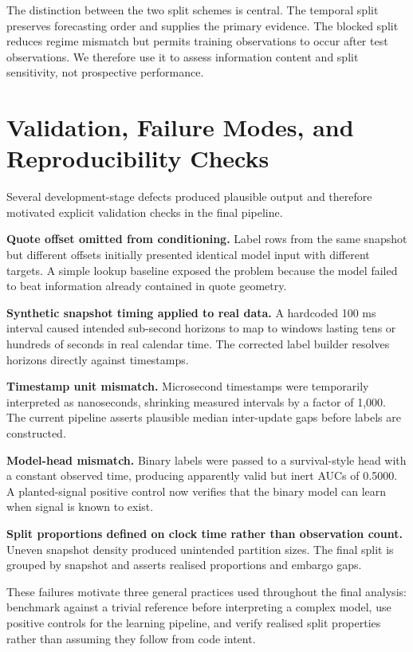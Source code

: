 \documentclass[11pt]{article}
\begin{document}
The distinction between the two split schemes is central. The temporal split
preserves forecasting order and supplies the primary evidence. The blocked
split reduces regime mismatch but permits training observations to occur after
test observations. We therefore use it to assess information content and split
sensitivity, not prospective performance.

\section{Validation, Failure Modes, and Reproducibility Checks}
\label{sec:defects}

Several development-stage defects produced plausible output and therefore
motivated explicit validation checks in the final pipeline.

\textbf{Quote offset omitted from conditioning.} Label rows from the same
snapshot but different offsets initially presented identical model input with
different targets. A simple lookup baseline exposed the problem because the
model failed to beat information already contained in quote geometry.

\textbf{Synthetic snapshot timing applied to real data.} A hardcoded 100 ms
interval caused intended sub-second horizons to map to windows lasting tens or
hundreds of seconds in real calendar time. The corrected label builder resolves
horizons directly against timestamps.

\textbf{Timestamp unit mismatch.} Microsecond timestamps were temporarily
interpreted as nanoseconds, shrinking measured intervals by a factor of 1,000.
The current pipeline asserts plausible median inter-update gaps before labels
are constructed.

\textbf{Model-head mismatch.} Binary labels were passed to a survival-style
head with a constant observed time, producing apparently valid but inert AUCs of
0.5000. A planted-signal positive control now verifies that the binary model can
learn when signal is known to exist.

\textbf{Split proportions defined on clock time rather than observation
count.} Uneven snapshot density produced unintended partition sizes. The final
split is grouped by snapshot and asserts realised proportions and embargo gaps.

These failures motivate three general practices used throughout the final
analysis: benchmark against a trivial reference before interpreting a complex
model, use positive controls for the learning pipeline, and verify realised
split properties rather than assuming they follow from code intent.
\end{document}

